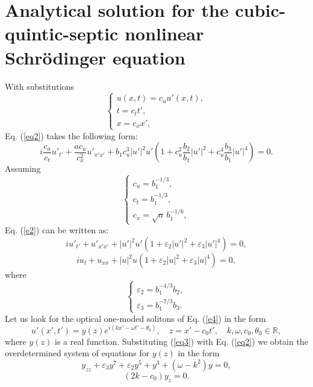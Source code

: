 \documentclass[preprint,12pt]{elsarticle}
\begin{document}
\section{Analytical solution for the cubic-quintic-septic nonlinear Schr\"{o}dinger equation}\label{ch2}
With substitutions
\begin{equation} \label{e1}
\begin{cases}
u(x,t)=c_{u} u'(x,t),\\
t=c_{t} t',\\
x=c_{x}x',
\end{cases}
\end{equation}
Eq. (\ref{eq2}) takes the following form:
\begin{equation}\label{e2}
i\frac{c_{u}}{c_{t}}u'_{t'}+\frac{a c_{u}}{c_{x}^{2}}u'_{x'x'}+b_{1}c_{u}^{3}|u'|^2 u'\left(1+c_{u}^{2}\frac{b_{2}}{b_{1}}|u'|^2+c_{u}^{4}\frac{b_{3}}{b_{1}}|u'|^4\right)=0.
\end{equation}
Assuming
\begin{equation} \label{e3}
\begin{cases}
c_{u} = b_{1}^{-1/3},\\
c_{t} = b_{1}^{-1/3},\\
c_{x} = \sqrt{a} \,b_{1}^{-1/6},
\end{cases}
\end{equation}
Eq. (\ref{e2}) can be written as:
\begin{equation}\label{e4}
iu'_{t'}+u'_{x'x'}+|u'|^2 u'\left(1+\varepsilon_{2}|u'|^2+\varepsilon_{3}|u'|^4\right)=0,
\end{equation}
\begin{equation}
iu_{t}+u_{xx}+|u|^2 u\left(1+\varepsilon_{2}|u|^2+\varepsilon_{3}|u|^4\right)=0,
\end{equation}
where
\begin{equation} \label{e5}
\begin{cases}
\varepsilon_{2}=b_{1}^{-4/3}b_{2},\\
\varepsilon_{3}=b_{1}^{-7/3}b_{3}.
\end{cases}
\end{equation}
Let us look for the optical one-moded solitons of Eq. (\ref{e4}) in the form
\begin{equation}\label{eq3}
u'(x',t')=y(z)e^{i(kx'-\omega t'-\theta_{0})}, \quad z=x'-c_{0}t',\quad k,\omega,c_{0},\theta_{0} \in \mathbb{R},
\end{equation}
where \(y(z)\) is a real function. Substituting (\ref{eq3}) with Eq. (\ref{eq2}) we obtain the overdetermined system of equations for \(y(z)\) in the form
\begin{equation} \label{eq4}
y_{zz}+\varepsilon_{3} y^{7} +\varepsilon_{2} y^{5} + y^{3}+\left(\omega-k^{2}\right) y=0,
\end{equation}
\begin{equation} \label{eq5}
(2 k-c_{0})y_{z}=0.
\end{equation}
\end{document}

